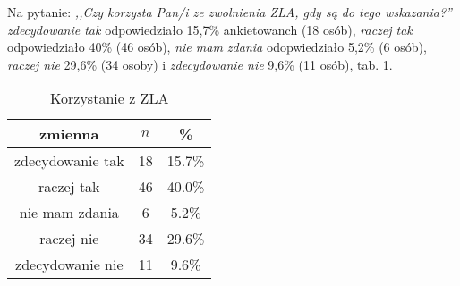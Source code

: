 Na pytanie: \textit{,,Czy korzysta Pan/i ze zwolnienia ZLA, gdy są do tego wskazania?''} \textit{zdecydowanie tak} odpowiedziało 15,7\% ankietowanch (18 osób), \textit{raczej tak} odpowiedziało 40\% (46 osób), \textit{nie mam zdania} odopwiedziało 5,2\% (6 osób), \textit{raczej nie} 29,6\% (34 osoby) i \textit{zdecydowanie nie} 9,6\% (11 osób), tab. \ref{tab:Q32}.

\begin{table}[H]
\caption{Korzystanie z ZLA}
\centering
\begin{tabular}{ | c | c | c |}
\hline
zmienna & $n$ & \% \\
\hline
zdecydowanie tak  &  18  & 15.7\% \\
\hline
raczej tak  &  46  & 40.0\% \\
\hline
nie mam zdania  &  6  & 5.2\% \\
\hline
raczej nie  &  34  & 29.6\% \\
\hline
zdecydowanie nie  &  11  & 9.6\% \\
\hline
\end{tabular}
\label{tab:Q32}
\end{table}
